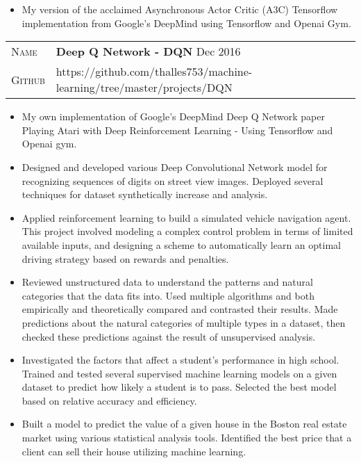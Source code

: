 \documentclass[10pt, a4paper, oneside, final]{scrartcl} %
\newcommand{\gray}{\rowcolor[gray]{.90}} %
\begin{document}
\begin{itemize}\itemsep1.5pt
\item My version of the acclaimed Asynchronous Actor Critic (A3C) Tensorflow implementation from Google's DeepMind using Tensorflow and Openai Gym.
\end{itemize}

\begin{center}
\begin{tabularx}{1.0\linewidth}{>{\raggedleft\scshape}p{2.2cm}X}
\gray Name & \textbf{Deep Q Network - DQN} \hfill Dec 2016\\
\gray Github & https://github.com/thalles753/machine-learning/tree/master/projects/DQN \\
\end{tabularx}
\end{center}

\begin{itemize}\itemsep1.5pt
\item My own implementation of Google's DeepMind Deep Q Network paper Playing Atari with Deep Reinforcement Learning - Using Tensorflow and Openai gym.
\end{itemize}

\begin{itemize}\itemsep1.5pt
\item Designed and developed various Deep Convolutional Network model for recognizing sequences of digits on street view images. Deployed several techniques for dataset synthetically increase and analysis. 

\item Applied reinforcement learning to build a simulated vehicle navigation agent. This project involved modeling a complex control problem in terms of limited available inputs, and designing a scheme to automatically learn an optimal driving strategy based on rewards and penalties.

\item Reviewed unstructured data to understand the patterns and natural categories that the data fits into. Used multiple algorithms and both empirically and theoretically compared and contrasted their results. Made predictions about the natural categories of multiple types in a dataset, then checked these predictions against the result of unsupervised analysis.

\item Investigated the factors that affect a student's performance in high school. Trained and tested several supervised machine learning models on a given dataset to predict how likely a student is to pass. Selected the best model based on relative accuracy and efficiency.

\item Built a model to predict the value of a given house in the Boston real estate market using various statistical analysis tools. Identified the best price that a client can sell their house utilizing machine learning.

\end{itemize}
\end{document}

